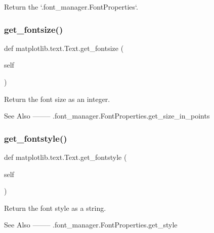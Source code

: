 \begin{DoxyVerb}Return the `.font_manager.FontProperties`.\end{DoxyVerb}
 \mbox{\label{classmatplotlib_1_1text_1_1Text_ad4ea1fb9343a6dd93ad69a0644a57045}} 
\subsubsection{\texorpdfstring{get\+\_\+fontsize()}{get\_fontsize()}}
{\footnotesize\ttfamily def matplotlib.\+text.\+Text.\+get\+\_\+fontsize (\begin{DoxyParamCaption}\item[{}]{self }\end{DoxyParamCaption})}

\begin{DoxyVerb}Return the font size as an integer.

See Also
--------
.font_manager.FontProperties.get_size_in_points
\end{DoxyVerb}
 \mbox{\label{classmatplotlib_1_1text_1_1Text_ab5f87a682ab1294d717bd1ed29cbfe7c}} 
\subsubsection{\texorpdfstring{get\+\_\+fontstyle()}{get\_fontstyle()}}
{\footnotesize\ttfamily def matplotlib.\+text.\+Text.\+get\+\_\+fontstyle (\begin{DoxyParamCaption}\item[{}]{self }\end{DoxyParamCaption})}

\begin{DoxyVerb}Return the font style as a string.

See Also
--------
.font_manager.FontProperties.get_style
\end{DoxyVerb}
 \mbox{\label{classmatplotlib_1_1text_1_1Text_ae88796b9843ca847ab14c7391255cd16}} 
